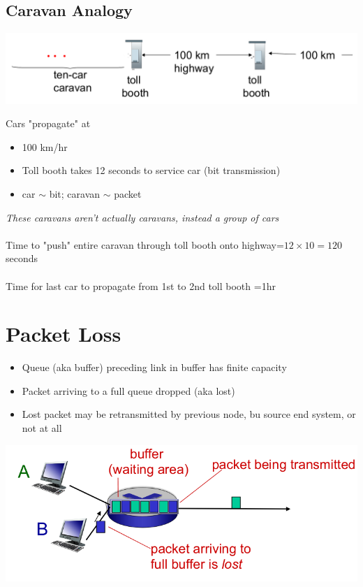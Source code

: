 \documentclass{article}[18pt]
\begin{document}
\subsection{Caravan Analogy}
\begin{center}
	\includegraphics[scale=0.6]{caravan}
\end{center}

Cars "propagate" at
\begin{itemize}
	\item 100 km/hr
	\item Toll booth takes 12 seconds to service car (bit transmission)
	\item car $\sim$ bit; caravan $\sim$ packet
\end{itemize}
\textit{These caravans aren't actually caravans, instead a group of cars}\\
\\
Time to "push" entire caravan through toll booth onto highway=$12\times 10=120$ seconds\\
\\
Time for last car to propagate from 1st to 2nd toll booth =1hr
\section{Packet Loss}
\begin{itemize}
	\item Queue (aka buffer) preceding link in buffer has finite capacity
	\item Packet arriving to a full queue dropped (aka lost)
	\item Lost packet may be retransmitted by previous node, bu source end system, or not at all
\end{itemize}
\begin{center}
	\includegraphics[scale=0.7]{packet_loss}
\end{center}
\end{document}
